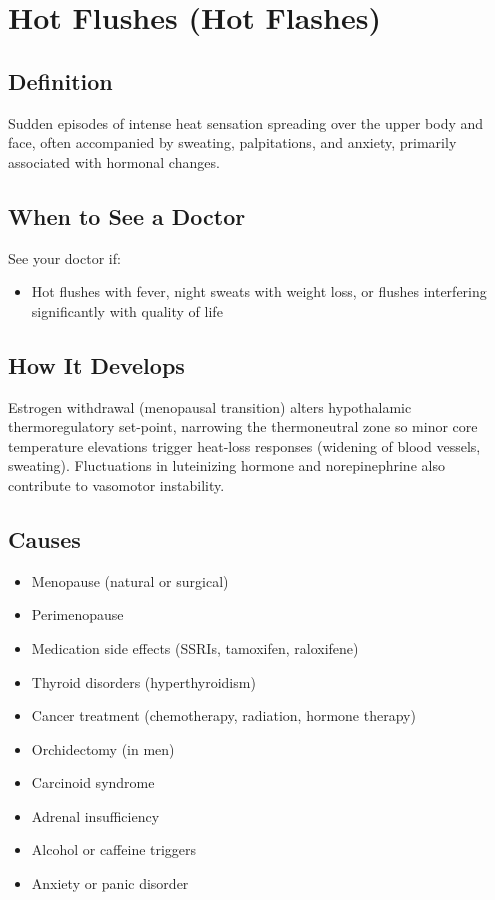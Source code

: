 \chapter{Hot Flushes (Hot Flashes)}

\section*{Definition}
Sudden episodes of intense heat sensation spreading over the upper body and face, often accompanied by sweating, palpitations, and anxiety, primarily associated with hormonal changes.

\section*{When to See a Doctor}
See your doctor if:
\begin{itemize}
  \item Hot flushes with fever, night sweats with weight loss, or flushes interfering significantly with quality of life
\end{itemize}

\section*{How It Develops}
Estrogen withdrawal (menopausal transition) alters hypothalamic thermoregulatory set-point, narrowing the thermoneutral zone so minor core temperature elevations trigger heat-loss responses (widening of blood vessels, sweating). Fluctuations in luteinizing hormone and norepinephrine also contribute to vasomotor instability.

\section*{Causes}
\begin{itemize}
  \item Menopause (natural or surgical)
  \item Perimenopause
  \item Medication side effects (SSRIs, tamoxifen, raloxifene)
  \item Thyroid disorders (hyperthyroidism)
  \item Cancer treatment (chemotherapy, radiation, hormone therapy)
  \item Orchidectomy (in men)
  \item Carcinoid syndrome
  \item Adrenal insufficiency
  \item Alcohol or caffeine triggers
  \item Anxiety or panic disorder
\end{itemize}

